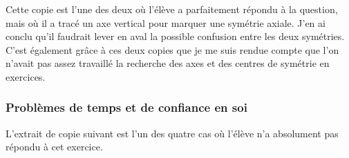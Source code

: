 \clearpage
\begin{figure}[!h]
\end{figure}

Cette copie est l'une des deux où l'élève a parfaitement répondu à la question, mais où il a tracé un axe vertical pour marquer une symétrie axiale. J'en ai conclu qu'il faudrait lever en aval la possible confusion entre les deux symétries. C'est également grâce à ces deux copies que je me suis rendue compte que l'on n'avait pas assez travaillé la recherche des axes et des centres de symétrie en exercices.

\subsubsection*{Problèmes de temps et de confiance en soi}

L'extrait de copie suivant est l'un des quatre cas où l'élève n'a absolument pas répondu à cet exercice.
\begin{figure}[!h]
\end{figure}

